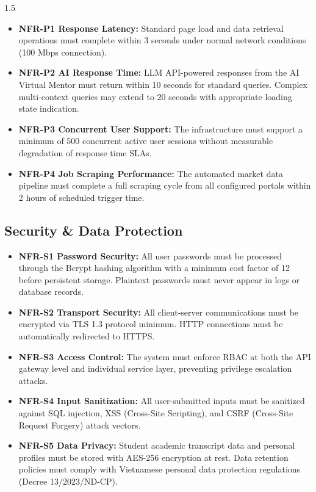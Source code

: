 \documentclass[12pt,a4paper]{report}
\begin{document}
\begin{spacing}{1.5}
		\begin{itemize}
			\item \textbf{NFR-P1 Response Latency:} Standard page load and data retrieval operations must complete within 3 seconds under normal network conditions (100 Mbps connection).
			\item \textbf{NFR-P2 AI Response Time:} LLM API-powered responses from the AI Virtual Mentor must return within 10 seconds for standard queries. Complex multi-context queries may extend to 20 seconds with appropriate loading state indication.
			\item \textbf{NFR-P3 Concurrent User Support:} The infrastructure must support a minimum of 500 concurrent active user sessions without measurable degradation of response time SLAs.
			\item \textbf{NFR-P4 Job Scraping Performance:} The automated market data pipeline must complete a full scraping cycle from all configured portals within 2 hours of scheduled trigger time.
		\end{itemize}
		
		\subsection{Security \& Data Protection}
		
		\begin{itemize}
			\item \textbf{NFR-S1 Password Security:} All user passwords must be processed through the Bcrypt hashing algorithm with a minimum cost factor of 12 before persistent storage. Plaintext passwords must never appear in logs or database records.
			\item \textbf{NFR-S2 Transport Security:} All client-server communications must be encrypted via TLS 1.3 protocol minimum. HTTP connections must be automatically redirected to HTTPS.
			\item \textbf{NFR-S3 Access Control:} The system must enforce RBAC at both the API gateway level and individual service layer, preventing privilege escalation attacks.
			\item \textbf{NFR-S4 Input Sanitization:} All user-submitted inputs must be sanitized against SQL injection, XSS (Cross-Site Scripting), and CSRF (Cross-Site Request Forgery) attack vectors.
			\item \textbf{NFR-S5 Data Privacy:} Student academic transcript data and personal profiles must be stored with AES-256 encryption at rest. Data retention policies must comply with Vietnamese personal data protection regulations (Decree 13/2023/ND-CP).
		\end{itemize}
		

\end{spacing}
\end{document}
